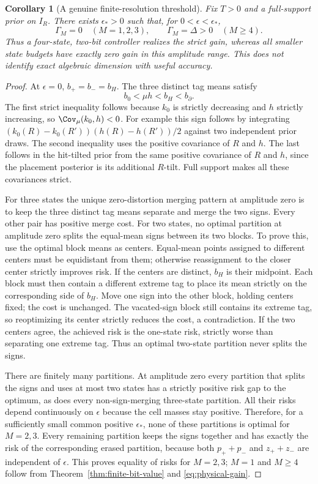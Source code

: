\documentclass[11pt]{amsart}
\newtheorem{corollary}[theorem]{Corollary}
\theoremstyle{definition}\newtheorem{definition}[theorem]{Definition}
\theoremstyle{remark}\newtheorem{remark}[theorem]{Remark}
\begin{document}
\begin{corollary}[A genuine finite-resolution threshold]\label{cor:threshold}
Fix $T>0$ and a full-support prior on $I_R$. There exists
$\epsilon_*>0$ such that, for $0<\epsilon<\epsilon_*$,
\begin{equation}\label{eq:threshold}
 \Gamma_M=0\quad(M=1,2,3),\qquad
 \Gamma_M=\Delta>0\quad(M\ge4).
\end{equation}
Thus a four-state, two-bit controller realizes the strict gain, whereas
all smaller state budgets have exactly zero gain in this amplitude range.
This does not identify exact algebraic dimension with useful accuracy.
\end{corollary}
\begin{proof}
At $\epsilon=0$, $b_+=b_-=b_H$. The three distinct tag means satisfy
\[
 b_0<\mu h<b_H<b_\partial.
\]
The first strict inequality follows because $k_0$ is strictly decreasing
and $h$ strictly increasing, so $\Cov_\mu(k_0,h)<0$.
For example this sign follows by integrating
$(k_0(R)-k_0(R'))(h(R)-h(R'))/2$ against two independent prior draws.
The second inequality uses the positive covariance of $R$ and $h$.
The last follows in the hit-tilted prior from the same positive covariance
of $R$ and $h$, since the placement posterior is its additional $R$-tilt.
Full support makes all these covariances strict.

For three states the unique zero-distortion merging pattern at amplitude
zero is to keep the three distinct tag means separate and merge the two
signs. Every other pair has positive merge cost. For two states, no optimal
partition at amplitude zero splits the equal-mean signs between its two
blocks. To prove this, use the optimal block means as centers. Equal-mean
points assigned to different centers must be equidistant from them;
otherwise reassignment to the closer center strictly improves risk.
If the centers are distinct, $b_H$ is their midpoint. Each block must
then contain a different extreme tag to place its mean strictly on the
corresponding side of $b_H$. Move one sign into the other block, holding
centers fixed; the cost is unchanged. The vacated-sign block still contains
its extreme tag, so reoptimizing its center strictly reduces the cost,
a contradiction. If the two centers agree, the achieved risk is the
one-state risk, strictly worse than separating one extreme tag. Thus an
optimal two-state partition never splits the signs.

There are finitely many partitions. At amplitude zero every partition
that splits the signs and uses at most two states has a strictly positive
risk gap to the optimum, as does every non-sign-merging three-state
partition. All their risks depend continuously on $\epsilon$ because
the cell masses stay positive. Therefore, for a sufficiently small common
positive $\epsilon_*$, none of these partitions is optimal for $M=2,3$.
Every remaining partition keeps the signs together and has exactly the
risk of the corresponding erased partition, because both $p_++p_-$
and $z_++z_-$ are independent of $\epsilon$. This proves equality of
risks for $M=2,3$; $M=1$ and $M\ge4$ follow from
Theorem~\ref{thm:finite-bit-value} and \eqref{eq:physical-gain}.
\end{proof}
\end{document}
